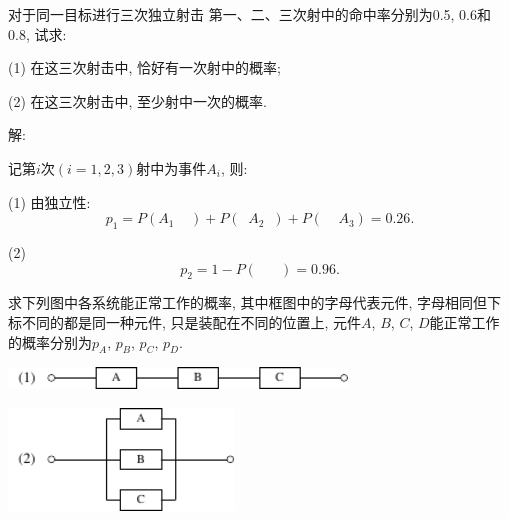 \documentclass[standard]{ExBook}
\begin{document}
\begin{qitems}
\vspace{-5em}

    \begin{bbox}
    \begin{shaded}
        \qitem
对于同一目标进行三次独立射击 第一、二、三次射中的命中率分别为0.5, 0.6和0.8, 试求:

(1) 在这三次射击中, 恰好有一次射中的概率;

(2) 在这三次射击中, 至少射中一次的概率.
    \end{shaded}
    \end{bbox}

\vspace{-5em}

    \begin{bbox}
解:

记第$i$次$(i=1,2,3)$射中为事件$A_{i}$, 则:

(1) 由独立性:
$$p_{1}=P(A_{1}\mathop{\overline{A_{2}}}\mathop{\overline{A_{3}}})+P(\mathop{\overline{A_{1}}}A_{2}\mathop{\overline{A_{3}}})+P(\mathop{\overline{A_{1}}}\mathop{\overline{A_{2}}}A_{3})=0.26.$$

(2) $$p_{2}=1-P(\mathop{\overline{A_{1}}}\mathop{\overline{A_{2}}}\mathop{\overline{A_{3}}})=0.96.$$
    \end{bbox}

\vspace{-5em}

    \begin{bbox}
    \begin{shaded}
        \qitem
求下列图中各系统能正常工作的概率, 其中框图中的字母代表元件, 字母相同但下标不同的都是同一种元件, 只是装配在不同的位置上, 元件$A$, $B$, $C$, $D$能正常工作的概率分别为$p_A$, $p_B$, $p_C$, $p_D$.

\begin{minipage}{9cm}
    \centering
    \includegraphics[width=9cm]{img/1.39_1.pdf}
\end{minipage}

\vspace{1em}

\begin{minipage}{6cm}
    \centering
    \includegraphics[width=6cm]{img/1.39_2.pdf}
\end{minipage}


\end{shaded}
\end{bbox}
\end{qitems}
\end{document}

